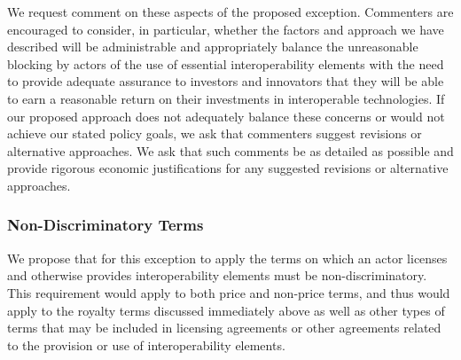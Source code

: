 \documentclass[twoside,11pt]{article}
\begin{document}
          We request comment on these aspects of the proposed exception. Commenters are encouraged to consider, in particular, whether the factors and approach we have described will be administrable and appropriately balance the unreasonable blocking by actors of the use of essential interoperability elements with the need to provide adequate assurance to investors and innovators that they will be able to earn a reasonable return on their investments in interoperable technologies. If our proposed approach does not adequately balance these concerns or would not achieve our stated policy goals, we ask that commenters suggest revisions or alternative approaches. We ask that such comments be as detailed as possible and provide rigorous economic justifications for any suggested revisions or alternative approaches.


          \subsubsection{Non-Discriminatory Terms}

          We propose that for this exception to apply the terms on which an actor licenses and otherwise provides interoperability elements must be non-discriminatory. This requirement would apply to both price and non-price terms, and thus would apply to the royalty terms discussed immediately above as well as other types of terms that may be included in licensing agreements or other agreements related to the provision or use of interoperability elements.
\end{document}
